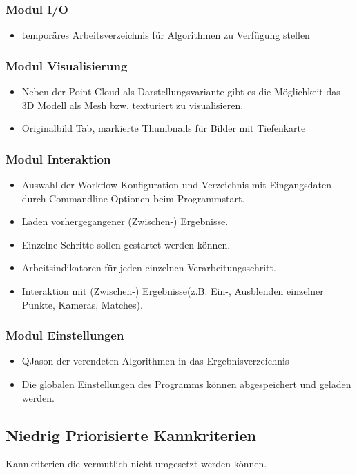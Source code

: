 \subsubsection{Modul I/O}
\begin{itemize}
\item temporäres Arbeitsverzeichnis für Algorithmen zu Verfügung stellen
\end{itemize}
\subsubsection{Modul Visualisierung}
\begin{itemize}
\item Neben der Point Cloud als Darstellungsvariante gibt es die Möglichkeit das 3D Modell als Mesh bzw. texturiert zu visualisieren.
\item Originalbild Tab, markierte Thumbnails für Bilder mit Tiefenkarte
\end{itemize}
\subsubsection{Modul Interaktion}
\begin{itemize}
\item Auswahl der Workflow-Konfiguration und Verzeichnis mit Eingangsdaten durch Commandline-Optionen beim Programmstart.
\item Laden vorhergegangener (Zwischen-) Ergebnisse.
\item Einzelne Schritte sollen gestartet werden können.
\item Arbeitsindikatoren für jeden einzelnen Verarbeitungsschritt.
\item Interaktion mit (Zwischen-) Ergebnisse(z.B. Ein-, Ausblenden einzelner Punkte, Kameras, Matches).
\end{itemize}
\subsubsection{Modul Einstellungen}
\begin{itemize}
\item QJason der verendeten Algorithmen in das Ergebnisverzeichnis 
\item Die globalen Einstellungen des Programms können abgespeichert und geladen werden.
\end{itemize}

\subsection{Niedrig Priorisierte Kannkriterien}
Kannkriterien die vermutlich nicht umgesetzt werden können.

